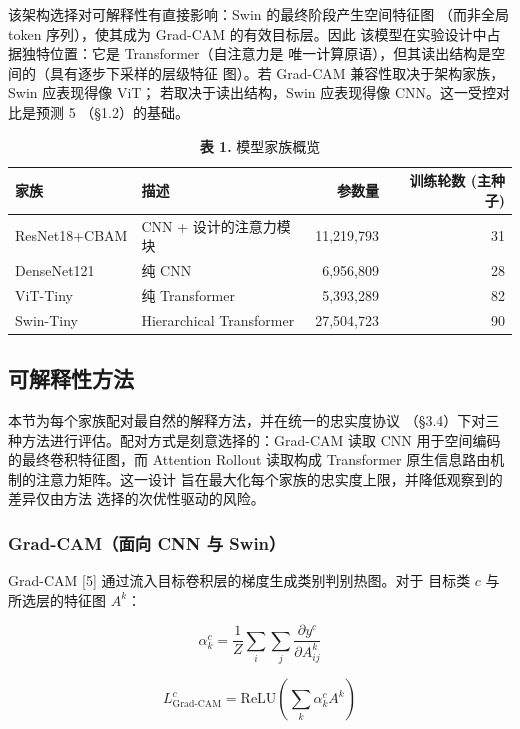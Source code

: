 \documentclass[11pt,a4paper]{article}
\begin{document}
该架构选择对可解释性有直接影响：Swin 的最终阶段产生空间特征图 （而非全局 token 序列），使其成为 Grad-CAM 的有效目标层。因此 该模型在实验设计中占据独特位置：它是 Transformer（自注意力是 唯一计算原语），但其读出结构是空间的（具有逐步下采样的层级特征 图）。若 Grad-CAM 兼容性取决于架构家族，Swin 应表现得像 ViT； 若取决于读出结构，Swin 应表现得像 CNN。这一受控对比是预测 5 （§1.2）的基础。

\begin{table}[htbp]
\centering
\small
\caption{\textbf{表 1.} 模型家族概览}
\begin{tabular}{llrr}
\toprule
家族 & 描述 & 参数量 & 训练轮数 (主种子) \\
\midrule
ResNet18+CBAM & CNN + 设计的注意力模块 & 11,219,793 & 31 \\
DenseNet121 & 纯 CNN & 6,956,809 & 28 \\
ViT-Tiny & 纯 Transformer & 5,393,289 & 82 \\
Swin-Tiny & Hierarchical Transformer & 27,504,723 & 90 \\
\bottomrule
\end{tabular}
\end{table}

\subsection{可解释性方法}

本节为每个家族配对最自然的解释方法，并在统一的忠实度协议 （§3.4）下对三种方法进行评估。配对方式是刻意选择的：Grad-CAM 读取 CNN 用于空间编码的最终卷积特征图，而 Attention Rollout 读取构成 Transformer 原生信息路由机制的注意力矩阵。这一设计 旨在最大化每个家族的忠实度上限，并降低观察到的差异仅由方法 选择的次优性驱动的风险。

\subsubsection{Grad-CAM（面向 CNN 与 Swin）}

Grad-CAM [5] 通过流入目标卷积层的梯度生成类别判别热图。对于 目标类 $c$ 与所选层的特征图 $A^k$：

\begin{equation}
\alpha_k^c = \frac{1}{Z} \sum_i \sum_j \frac{\partial y^c}{\partial A^k_{ij}}
\tag{8}
\end{equation}

\begin{equation}
L_{\text{Grad-CAM}}^c = \text{ReLU}\!\left(\sum_k \alpha_k^c A^k\right)
\tag{9}
\end{equation}
\end{document}

